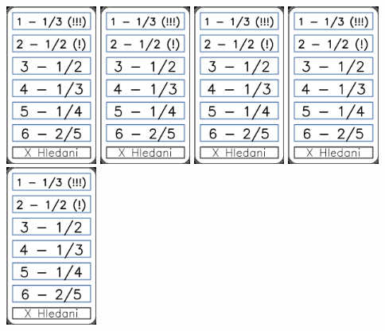 \documentclass[a4paper]{article}
\begin{document}
	\includegraphics[width=3.0cm]{img-8_5}
	\includegraphics[width=3.0cm]{img-8_6}
	\includegraphics[width=3.0cm]{img-8_7}
	\includegraphics[width=3.0cm]{img-8_8}
	\includegraphics[width=3.0cm]{img-8_9}
\end{document}
